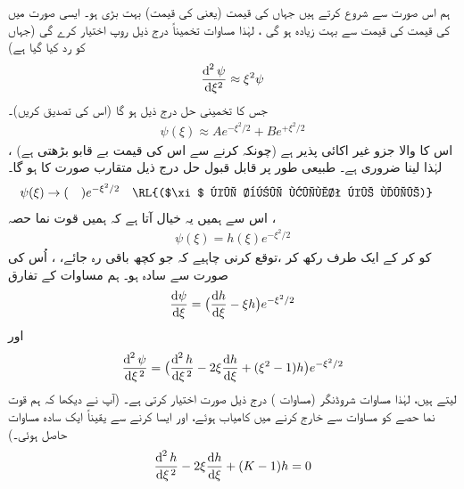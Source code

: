 ہم اس صورت سے شروع کرتے ہیں جہاں  کی قیمت (یعنی  کی قیمت)  بہت بڑی ہو۔ ایسی صورت میں
 کی قیمت  کی قیمت سے بہت زیادہ ہو گی ، لہٰذا مساوات  تخمیناً   درج ذیل روپ اختیار کرے گی (جہاں  کو رد کیا گیا ہے)
\begin{align}
\frac{\dif^{\,2}\psi}{\dif \xi^{2}}\approx \xi^{2}\psi
\end{align}
جس کا تخمینی حل درج ذیل  ہو گا  (اس کی تصدیق کریں)۔ 
\begin{align}\label{مساوات_غیر_تابع_وقت_متقارب_حل}
\psi(\xi)\approx Ae^{-\xi^{2}/2}+Be^{+\xi^{2}/2}
\end{align}
 اس کا     والا جزو غیر اکائی پذیر ہے (چونکہ  کرنے سے اس کی قیمت بے قابو بڑھتی ہے) ، لہٰذا  لینا ضروری ہے۔ طبیعی طور پر قابل قبول حل درج ذیل متقارب صورت کا ہو گا۔
\begin{align}
\psi(\xi)&\to(\quad )e^{-\xi^{2}/2}&&\text{\RL{($\xi$ کی بڑی قیمت کے لیے)}}
\end{align}
اس سے ہمیں یہ  خیال آتا ہے کہ ہمیں قوت نما حصہ ،
\begin{align}\label{مساوات_شروڈنگر_متقارب_الف}
\psi(\xi)=h(\xi)e^{-\xi^{2}/2}
\end{align}
کو  کر    کے  ایک طرف رکھ کر ،توقع کرنی چاہیے کہ جو کچھ باقی رہ جائے، ، اُس کی صورت  سے سادہ ہو۔ ہم مساوات  کے تفارق
\begin{align*}
\frac{\dif{\psi}}{\dif{\xi}}=\big(\frac{\dif{h}}{\dif{\xi}}-\xi h\big )e^{-\xi^{2}/2}
\end{align*}
اور
\begin{align*}
\frac{\dif^{\,2}{\psi}}{\dif{\xi^{\,2}}}=\big (\frac{\dif^{\,2}{h}}{\dif{\xi^{\,2}}}-2\xi\frac{\dif{h}}{\dif{\xi}}+(\xi^{2}-1)h\big )e^{-\xi^{2}/2}
\end{align*}
 لیتے ہیں،  لہٰذا مساوات شروڈنگر (مساوات ) درج ذیل صورت اختیار کرتی ہے۔ (آپ نے دیکھا کہ ہم قوت نما حصے کو   مساوات سے خارج کرنے میں کامیاب ہوئے، اور ایسا کرنے سے یقیناً ایک سادہ مساوات حاصل ہوئی۔)
\begin{align}\label{مساوات_شروڈنگر_فروبنیوس_الف}
\frac{\dif^{\,2}{h}}{\dif{\xi^{\,2}}}-2\xi\frac{\dif{h}}{\dif{\xi}}+(K-1)h=0
\end{align}
